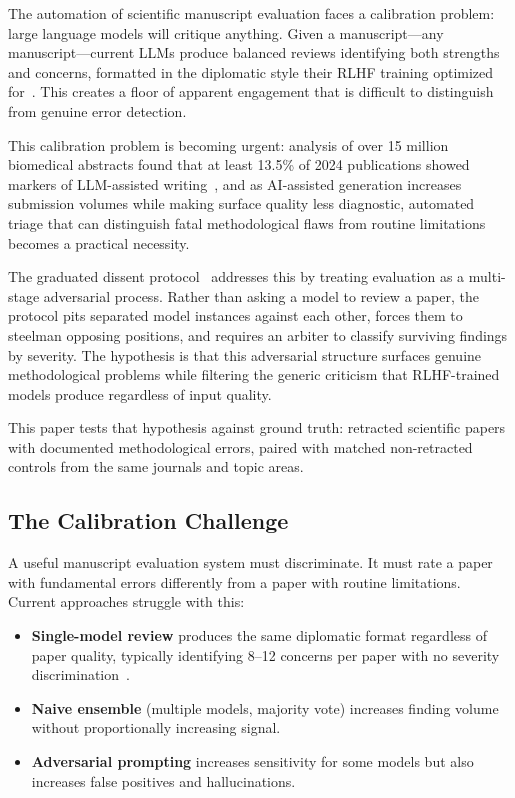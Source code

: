 \documentclass[11pt]{article}
\begin{document}
The automation of scientific manuscript evaluation faces a calibration problem: large language models will critique anything. Given a manuscript---any manuscript---current LLMs produce balanced reviews identifying both strengths and concerns, formatted in the diplomatic style their RLHF training optimized for~\cite{brilliant2026selfcorrection}. This creates a floor of apparent engagement that is difficult to distinguish from genuine error detection.

This calibration problem is becoming urgent: analysis of over 15 million biomedical abstracts found that at least 13.5\% of 2024 publications showed markers of LLM-assisted writing~\cite{kobak2025llm}, and as AI-assisted generation increases submission volumes while making surface quality less diagnostic, automated triage that can distinguish fatal methodological flaws from routine limitations becomes a practical necessity.

The graduated dissent protocol~\cite{brilliant2026graduated} addresses this by treating evaluation as a multi-stage adversarial process. Rather than asking a model to review a paper, the protocol pits separated model instances against each other, forces them to steelman opposing positions, and requires an arbiter to classify surviving findings by severity. The hypothesis is that this adversarial structure surfaces genuine methodological problems while filtering the generic criticism that RLHF-trained models produce regardless of input quality.

This paper tests that hypothesis against ground truth: retracted scientific papers with documented methodological errors, paired with matched non-retracted controls from the same journals and topic areas.

\subsection{The Calibration Challenge}

A useful manuscript evaluation system must discriminate. It must rate a paper with fundamental errors differently from a paper with routine limitations. Current approaches struggle with this:

\begin{itemize}
\item \textbf{Single-model review} produces the same diplomatic format regardless of paper quality, typically identifying 8--12 concerns per paper with no severity discrimination~\cite{brilliant2026selfcorrection}.
\item \textbf{Naive ensemble} (multiple models, majority vote) increases finding volume without proportionally increasing signal.
\item \textbf{Adversarial prompting} increases sensitivity for some models but also increases false positives and hallucinations.
\end{itemize}
\end{document}
